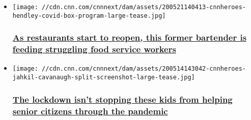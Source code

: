 \begin{itemize}
\item
  \href{/2020/05/21/world/coronavirus-feeding-struggling-restaurant-workers-cnnheroes/index.html}{}

  \texttt{[image: //cdn.cnn.com/cnnnext/dam/assets/200521140413-cnnheroes-hendley-covid-box-program-large-tease.jpg]}

  \hypertarget{as-restaurants-start-to-reopen-this-former-bartender-is-feeding-struggling-food-service-workers}{%
  \subsubsection{\texorpdfstring{\href{/2020/05/21/world/coronavirus-feeding-struggling-restaurant-workers-cnnheroes/index.html}{As
  restaurants start to reopen, this former bartender is feeding
  struggling food service
  workers}}{As restaurants start to reopen, this former bartender is feeding struggling food service workers}}\label{as-restaurants-start-to-reopen-this-former-bartender-is-feeding-struggling-food-service-workers}}
\end{itemize}

\begin{itemize}
\item
  \href{/2020/05/14/us/coronavirus-kids-helping-senior-citizens-cnnheroes/index.html}{}

  \texttt{[image: //cdn.cnn.com/cnnnext/dam/assets/200514143042-cnnheroes-jahkil-cavanaugh-split-screenshot-large-tease.jpg]}

  \hypertarget{the-lockdown-isnt-stopping-these-kids-from-helping-senior-citizens-through-the-pandemic}{%
  \subsubsection{\texorpdfstring{\href{/2020/05/14/us/coronavirus-kids-helping-senior-citizens-cnnheroes/index.html}{The
  lockdown isn't stopping these kids from helping senior citizens
  through the
  pandemic}}{The lockdown isn't stopping these kids from helping senior citizens through the pandemic}}\label{the-lockdown-isnt-stopping-these-kids-from-helping-senior-citizens-through-the-pandemic}}
\end{itemize}

